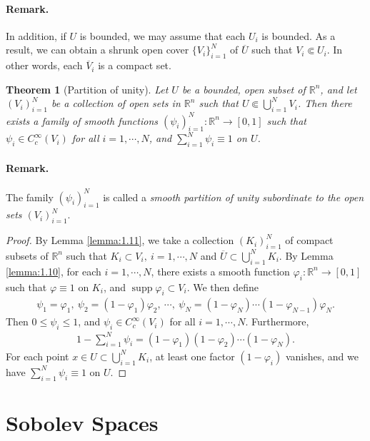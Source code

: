\documentclass{article}
\numberwithin{equation}{section}
\newcommand{\bbR}{\mathbb{R}}
\newcommand{\ol}{\overline}
\DeclareMathOperator{\supp}{supp}
\theoremstyle{plain}
\newtheorem{theorem}{Theorem}[section]
\theoremstyle{definition}
\begin{document}
\paragraph{Remark.} In addition, if $U$ is bounded, we may assume that each $U_i$ is bounded. As a result, we can obtain a shrunk open cover $\{V_i\}_{i=1}^N$ of $\ol{U}$ such that $V_i\Subset U_i$. In other words, each $\ol{V}_i$ is a compact set.

\begin{theorem}[Partition of unity]\label{thm:1.12}
Let $U$ be a bounded, open subset of $\bbR^n$, and let $(V_i)_{i=1}^N$ be a collection of open sets in $\bbR^n$ such that $U\Subset\bigcup_{i=1}^N V_i$. Then there exists a family of smooth functions $(\psi_i)_{i=1}^N:\bbR^n\to[0,1]$ such that $\psi_i\in C_c^\infty(V_i)$ for all $i=1,\cdots, N$, and $\sum_{i=1}^N\psi_i\equiv 1$ on $U$.
\end{theorem}

\paragraph{Remark.} The family $(\psi_i)_{i=1}^N$ is called a \textit{smooth partition of unity subordinate to the open sets $(V_i)_{i=1}^N$}.
\begin{proof}
By Lemma \ref{lemma:1.11}, we take a collection $(K_i)_{i=1}^N$ of compact subsets of $\bbR^n$ such that $K_i\subset V_i,\ i=1,\cdots,N$ and $\ol{U}\subset\bigcup_{i=1}^N K_i$. By Lemma \ref{lemma:1.10}, for each $i=1,\cdots,N$, there exists a smooth function $\varphi_i:\bbR^n\to[0,1]$ such that $\varphi\equiv 1$ on $K_i$, and $\supp\varphi_i\subset V_i$. We then define
\begin{align*}
	\psi_1 = \varphi_1,\ \psi_2=(1-\varphi_1)\varphi_2,\ \cdots,\ \psi_N=(1-\varphi_N)\cdots(1-\varphi_{N-1})\varphi_N.
\end{align*}
Then $0\leq\psi_i\leq 1$, and $\psi_i\in C_c^\infty(V_i)$ for all $i=1,\cdots,N$. Furthermore,
\begin{align*}
	1-\sum_{i=1}^N\psi_i = (1-\varphi_1)(1-\varphi_2)\cdots(1-\varphi_N).
\end{align*}
For each point $x\in U\subset\bigcup_{i=1}^NK_i$, at least one factor $(1-\varphi_i)$ vanishes, and we have $\sum_{i=1}^N\psi_i\equiv 1$ on $U$.
\end{proof}

\newpage
\section{Sobolev Spaces}
\end{document}
